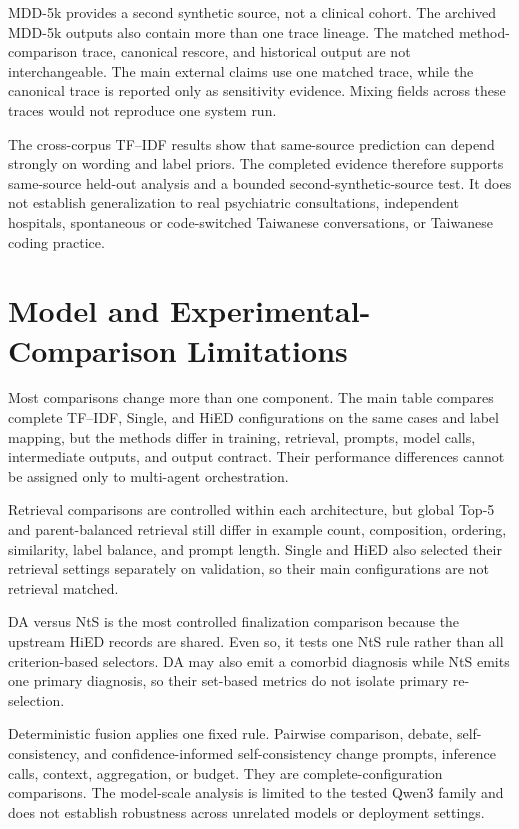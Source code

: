 MDD-5k provides a second synthetic source, not a clinical cohort. The archived MDD-5k outputs also contain more than one trace lineage. The matched method-comparison trace, canonical rescore, and historical output are not interchangeable. The main external claims use one matched trace, while the canonical trace is reported only as sensitivity evidence. Mixing fields across these traces would not reproduce one system run.

The cross-corpus TF--IDF results show that same-source prediction can depend strongly on wording and label priors. The completed evidence therefore supports same-source held-out analysis and a bounded second-synthetic-source test. It does not establish generalization to real psychiatric consultations, independent hospitals, spontaneous or code-switched Taiwanese conversations, or Taiwanese coding practice.

\section{Model and Experimental-Comparison Limitations}
\label{sec:model-comparison-limitations}

Most comparisons change more than one component. The main table compares complete TF--IDF, Single, and HiED configurations on the same cases and label mapping, but the methods differ in training, retrieval, prompts, model calls, intermediate outputs, and output contract. Their performance differences cannot be assigned only to multi-agent orchestration.

Retrieval comparisons are controlled within each architecture, but global Top-5 and parent-balanced retrieval still differ in example count, composition, ordering, similarity, label balance, and prompt length. Single and HiED also selected their retrieval settings separately on validation, so their main configurations are not retrieval matched.

DA versus NtS is the most controlled finalization comparison because the upstream HiED records are shared. Even so, it tests one NtS rule rather than all criterion-based selectors. DA may also emit a comorbid diagnosis while NtS emits one primary diagnosis, so their set-based metrics do not isolate primary re-selection.

Deterministic fusion applies one fixed rule. Pairwise comparison, debate, self-consistency, and confidence-informed self-consistency change prompts, inference calls, context, aggregation, or budget. They are complete-configuration comparisons. The model-scale analysis is limited to the tested Qwen3 family and does not establish robustness across unrelated models or deployment settings.

